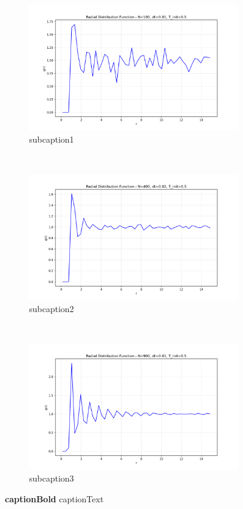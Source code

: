 \begin{figure}[H]
	\centering
	\begin{subfigure}{0.5\textwidth}
		\includegraphics[width=\textwidth]{media/final_rdf_N100_dt0.01_T0.5_final.png}
		\caption{subcaption1}
		\label{sfig:sublabel1}
	\end{subfigure}%
	~
	\begin{subfigure}{0.5\textwidth}
		\includegraphics[width=\textwidth]{media/final_rdf_N400_dt0.02_T0.5_final.png}
		\caption{subcaption2}
		\label{sfig:sublabel2}
	\end{subfigure}
	~
	\begin{subfigure}{0.5\textwidth}
		\includegraphics[width=\textwidth]{media/final_rdf_N900_dt0.01_T0.5_final.png}
		\caption{subcaption3}
		\label{sfig:sublabel3}
	\end{subfigure}%
	\caption{\textbf{captionBold}
		captionText
	}
	\label{fig:figureLabel}
\end{figure}


